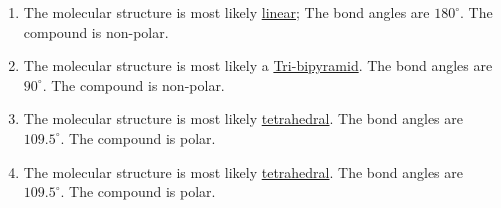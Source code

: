 \documentclass[12pt]{article}
\begin{document}
\begin{enumerate}
\begin{enumerate}
      \item {}

        \vspace{5pt}
        \begin{multicols}{2}
          \hspace{110pt}\hspace{20pt}
          The molecular structure is most likely \underline{linear}; The bond angles are $180^{\circ}$. The compound is non-polar.
      \end{multicols}
        \vspace{5pt}

      \item {}

        \vspace{5pt}
        \begin{multicols}{2}
          \hspace{110pt}\hspace{20pt}
          The molecular structure is most likely a \underline{Tri-bipyramid}. The bond angles are $90^{\circ}$. The compound is non-polar.
      \end{multicols}
        \vspace{5pt}

      \item {}

        \vspace{5pt}
        \begin{multicols}{2}
          \hspace{110pt}\hspace{20pt}
          The molecular structure is most likely \underline{tetrahedral}. The bond angles are $109.5^{\circ}$. The compound is polar.
      \end{multicols}
        \vspace{5pt}

      \item {}

        \vspace{5pt}
        \begin{multicols}{2}
          \hspace{110pt}\hspace{20pt}
          The molecular structure is most likely \underline{tetrahedral}. The bond angles are $109.5^{\circ}$. The compound is polar.
      \end{multicols}
        \vspace{5pt}


\end{enumerate}
\end{enumerate}
\end{document}
